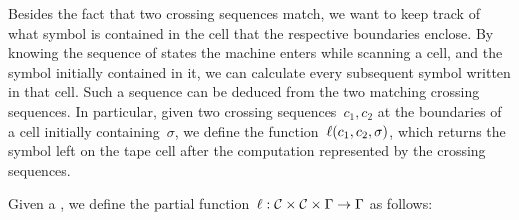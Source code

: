 Besides the fact that two crossing sequences match, we want to keep track of what symbol is contained in the cell that the respective boundaries enclose.
By knowing the sequence of states the machine enters while scanning a cell, and the symbol initially contained in it, we can calculate every subsequent symbol written in that cell.
Such a sequence can be deduced from the two matching crossing sequences.
In particular, given two crossing sequences~$c_1,c_2$ at the boundaries of a cell initially containing~$\sigma$, we define the function~$\ell(c_1,c_2,\sigma)$, which returns the symbol left on the tape cell after the computation represented by the crossing sequences.
\begin{defn}
	Given a \kDLA, we define the partial function~$\ell:\mathcal C\times\mathcal C\times\Gamma\to\Gamma$ as follows:


\end{defn}
